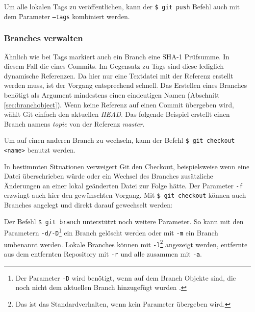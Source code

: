 
Um alle lokalen Tags zu veröffentlichen, kann der \texttt{\$ git push} Befehl auch mit
dem Parameter \texttt{--tags} kombiniert werden. \cite[70-71,162-163]{gitosp}


\subsubsection{Branches verwalten}
Ähnlich wie bei Tags markiert auch ein Branch eine \gls{SHA-1} Prüfsumme. In
diesem Fall die eines Commits. Im Gegensatz zu Tags sind diese lediglich
dynamische Referenzen. Da hier nur eine Textdatei mit der Referenz erstellt
werden muss, ist der Vorgang entsprechend schnell. Das Erstellen eines
Branches benötigt als Argument mindestens einen eindeutigen Namen (Abschnitt
\ref{sec:branchobject}). Wenn keine Referenz auf einen Commit übergeben wird,
wählt Git einfach den aktuellen \textit{\gls{HEAD}}. Das folgende Beispiel
erstellt einen Branch namens \textit{topic} von der Referenz \textit{master}.


Um auf einen anderen Branch zu wechseln, kann der Befehl \texttt{\$ git checkout
<name>} benutzt werden.

In bestimmten Situationen verweigert Git den Checkout, beispielsweise wenn eine
Datei überschrieben würde oder ein Wechsel des Branches zusätzliche Änderungen
an einer lokal geänderten Datei zur Folge hätte. Der Parameter \texttt{-f}
erzwingt auch hier den gewünschten Vorgang. Mit \texttt{\$ git checkout} können
auch Branches angelegt und direkt darauf gewechselt werden:


Der Befehl \texttt{\$ git branch} unterstützt noch weitere Parameter. So kann
mit den Parametern \texttt{-d/-D}\footnote{Der Parameter \texttt{-D} wird
benötigt, wenn auf dem Branch Objekte sind, die noch nicht dem aktuellen Branch
hinzugefügt wurden \cite[67]{gitosp}.} ein Branch gelöscht werden oder mit
\texttt{-m} ein Branch umbenannt werden. Lokale Branches können mit
\texttt{-l}\footnote{Das ist das Standardverhalten, wenn kein Parameter
übergeben wird.} angezeigt werden, entfernte aus dem entfernten Repository mit
\texttt{-r} und alle zusammen mit \texttt{-a}. \cite[65-67]{gitosp}

